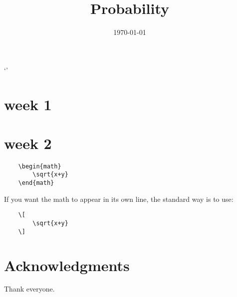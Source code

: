 \documentclass[12pt]{article}
\begin{document}
\title{Probability}


\date{\today}

\maketitle`'

\section{week 1}


\section{week 2}








\newpage
\begin{verbatim}
    \begin{math}    
        \sqrt{x+y}
    \end{math}
\end{verbatim}

If you want the math to appear in its own line, the standard way is to use:

\begin{verbatim}
    \[
        \sqrt{x+y}
    \]
\end{verbatim}


\section*{Acknowledgments}

Thank everyone.


\BibTexMode{%
   
   
}%
\BibLatexMode{\printbibliography}
\end{document}
